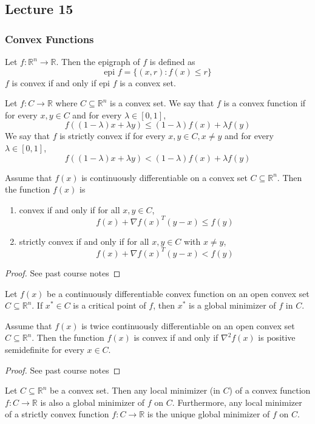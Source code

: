 
\subsection{Lecture 15}
\subsubsection{Convex Functions}
\begin{definition}[Epigraph]
    Let $f: \mathbb R^n \to \mathbb R$. Then the epigraph of $f$ is defined as
    $$\text{epi }f = \{(x, r): f(x) \leq r\}$$
    $f$ is convex if and only if $\text{epi }f$ is a convex set.
\end{definition}

\begin{definition}
    Let $f: C \to \mathbb R$ where $C \subseteq \mathbb R^n$ is a convex set. We say that $f$ is a convex function if for every $x, y \in C$ and for every $\lambda \in [0,1]$,
    $$f((1 - \lambda)x + \lambda y) \leq (1 - \lambda) f(x) + \lambda f(y)$$
    We say that $f$ is strictly convex if for every $x, y \in C, x \neq y$ and for every $\lambda \in [0,1]$,
    $$f((1 - \lambda)x + \lambda y) < (1 - \lambda) f(x) + \lambda f(y)$$
\end{definition}
\begin{theorem}
    Assume that $f(x)$ is continuously differentiable on a convex set $C \subseteq \mathbb R^n$. Then the function $f(x)$ is
    \begin{enumerate}
        \item convex if and only if for all $x, y \in C$, $$f(x) + \nabla f(x)^T (y - x) \leq f(y)$$
        \item strictly convex if and only if for all $x, y \in C$ with $x \neq y$,
        $$f(x) + \nabla f(x)^T (y - x) < f(y)$$
    \end{enumerate}
\end{theorem}
\begin{proof}[Proof]
    See past course notes
\end{proof}
\begin{corollary}
    Let $f(x)$ be a continuously differentiable convex function on an open convex set $C \subseteq \mathbb R^n$. If $x^* \in C$ is a critical point of $f$, then $x^*$ is a global minimizer of $f$ in $C$.
\end{corollary}
\begin{theorem}
    Assume that $f(x)$ is twice continuously differentiable on an open convex set $C \subseteq \mathbb R^n$. Then the function $f(x)$ is convex if and only if $\nabla^2 f(x)$ is positive semidefinite for every $x \in C$.
\end{theorem}
\begin{proof}[Proof]
    See past course notes
\end{proof}
\begin{theorem}[]
    Let $C \subseteq \mathbb R^n$ be a convex set. Then any local minimizer (in $C$) of a convex function $f: C \to \mathbb R$ is also a global minimizer of $f$ on $C$. Furthermore, any local minimizer of a strictly convex function $f: C \to \mathbb R$ is the unique global minimizer of $f$ on $C$.
\end{theorem}
